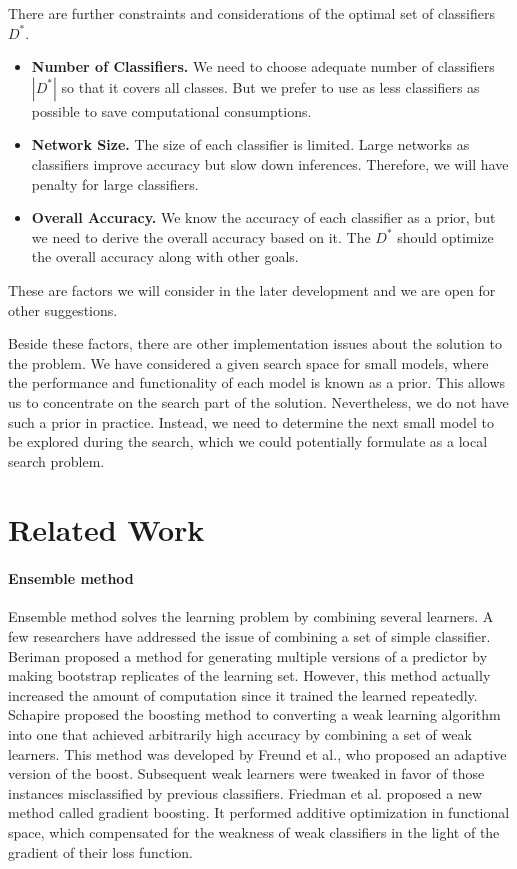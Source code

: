 \documentclass[acmsmall,nonacm]{acmart}\settopmatter{}
\begin{document}
There are further constraints and considerations of the optimal set of classifiers $D^*$.
\begin{itemize}
    \item \textbf{Number of Classifiers.} We need to choose adequate number of classifiers $|D^*|$ so that it covers all classes. But we prefer to use as less classifiers as possible to save computational consumptions.
    \item \textbf{Network Size.} The size of each classifier is limited. Large networks as classifiers improve accuracy but slow down inferences. Therefore, we will have penalty for large classifiers.
    \item \textbf{Overall Accuracy.} We know the accuracy of each classifier as a prior, but we need to derive the overall accuracy based on it. The $D^*$ should optimize the overall accuracy along with other goals.
\end{itemize}
These are factors we will consider in the later development and we are open for other suggestions.

Beside these factors, there are other implementation issues about the solution to the problem.
We have considered a given search space for small models, where the performance and functionality of each model is known as a prior.
This allows us to concentrate on the search part of the solution.
Nevertheless, we do not have such a prior in practice.
Instead, we need to determine the next small model to be explored during the search, which we could potentially formulate as a local search problem.

\section{Related Work}
\paragraph{\textbf{Ensemble method}} 
Ensemble method solves the learning problem by combining several learners.
A few researchers have addressed the issue of combining a set of simple classifier. 
Beriman\cite{BreimanBagging} proposed a method for generating multiple versions of a predictor by making bootstrap replicates of the learning set. 
However, this method actually increased the amount of computation since it trained the learned repeatedly.
Schapire\cite{Schapire1989The} proposed the boosting method to converting a weak learning algorithm into one that achieved arbitrarily high accuracy by combining a set of weak learners.
This method was developed by Freund et al.\cite{Freund1995A}, who proposed an adaptive version of the boost.
Subsequent weak learners were tweaked in favor of those instances misclassified by previous classifiers. 
Friedman et al.\cite{FriedmanGreedy} proposed a new method called gradient boosting. 
It performed additive optimization in functional space, which compensated for the weakness of weak classifiers in the light of the gradient of their loss function.



% 





\end{document}
